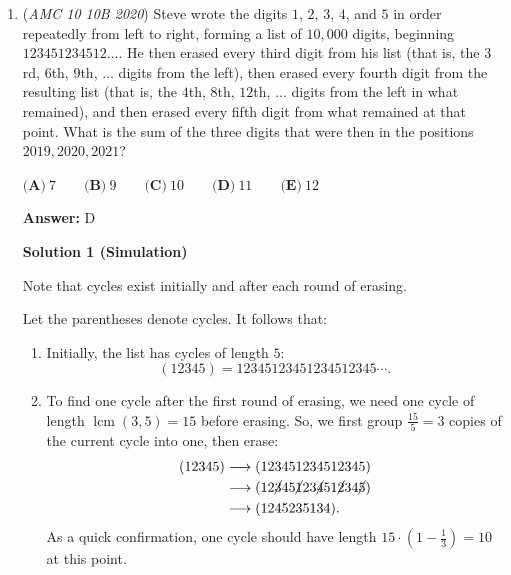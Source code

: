 \begin{enumerate}
 Now, we have to subtract off the six mini-sectors between the triangle and the shaded area. The area of one of these mini-sectors is the difference between a $60^{\circ}$ sector of the semicircle and the equilateral we just drew. The area of a sector is just $\frac{\pi}{6}$, and the area of a triangle is $\frac{\sqrt{3}}{4}.$ Therefore our combined area of the mini-sectors is 
 \[6\left(\frac{\pi}{6} - \frac{\sqrt{3}}{4}\right) = \pi-\frac{3\sqrt{3}}{2}.\]Subtracting this from the area of the (smaller) hexagon, the desired area is 

 
 \[\frac{3\sqrt{3}}{2} -\left(\pi - \frac{3\sqrt{3}}{2}\right) = \boxed{\textbf{(D)} ~3\sqrt{3} - \pi}\]

 -Benedict T (countmath1)

 


	\item (\textit{AMC 10 10B 2020}) Steve wrote the digits $1$, $2$, $3$, $4$, and $5$ in order repeatedly from left to right, forming a list of $10,000$ digits, beginning $123451234512\ldots$. He then erased every third digit from his list (that is, the $3$rd, $6$th, $9$th, $\ldots$ digits from the left), then erased every fourth digit from the resulting list (that is, the $4$th, $8$th, $12$th, $\ldots$ digits from the left in what remained), and then erased every fifth digit from what remained at that point. What is the sum of the three digits that were then in the positions $2019, 2020, 2021$?


 $\textbf{(A)}\ 7 \qquad\textbf{(B)}\ 9 \qquad\textbf{(C)}\ 10 \qquad\textbf{(D)}\ 11 \qquad\textbf{(E)}\ 12$

 \textbf{Answer: }D



\textbf{Solution 1 (Simulation)}

Note that cycles exist initially and after each round of erasing.

 Let the parentheses denote cycles. It follows that:

 
            \begin{enumerate} 
        \item Initially, the list has cycles of length $5:$ 
 \[(12345)=12345123451234512345\cdots.\]

        \item To find one cycle after the first round of erasing, we need one cycle of length $\operatorname{lcm}(3,5)=15$ before erasing. So, we first group $\frac{15}{5}=3$ copies of the current cycle into one, then erase:
 \begin{align*} (12345)&\longrightarrow(123451234512345) \\ &\longrightarrow(12\cancel{3}45\cancel{1}23\cancel{4}51\cancel{2}34\cancel{5}) \\ &\longrightarrow(1245235134). \end{align*}
As a quick confirmation, one cycle should have length $15\cdot\left(1-\frac{1}{3}\right)=10$ at this point.


\end{enumerate}
\end{enumerate}
